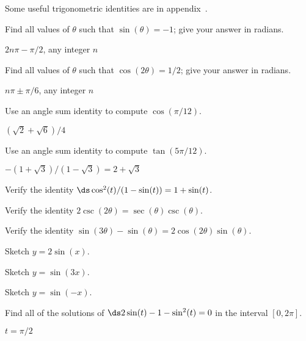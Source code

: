 \begin{exercises} Some useful trigonometric identities are in
appendix~.

\begin{exercise} Find all values of $\theta$ such that
$\sin(\theta) = -1$; give your answer in radians.
\begin{answer} $2n\pi-\pi/2$, any integer $n$
\end{answer}\end{exercise}

\begin{exercise} Find all values of $\theta$ such that
$\cos(2\theta) = 1/2$; give your answer in radians.
\begin{answer} $n\pi\pm\pi/6$, any integer $n$
\end{answer}\end{exercise}

\begin{exercise} Use an angle sum identity to compute
  $\cos(\pi/12)$.
\begin{answer} $(\sqrt2+\sqrt6)/4$
\end{answer}\end{exercise}

\begin{exercise} Use an angle sum identity to compute
  $\tan(5\pi/12)$.
\begin{answer} $-(1+\sqrt3)/(1-\sqrt3)=2+\sqrt3$
\end{answer}\end{exercise}

\begin{exercise} Verify the identity $\ds \cos^2(t)/(1-\sin(t)) =
  1+\sin(t)$.
\end{exercise}

\begin{exercise} Verify the identity $2\csc(2\theta)=\sec(\theta)\csc(\theta)$.
\end{exercise}

\begin{exercise} Verify the identity $\sin(3\theta) - \sin(\theta) = 2\cos(2\theta)
  \sin(\theta)$.
\end{exercise}

\begin{exercise} Sketch $y=2\sin(x)$.
\end{exercise}

\begin{exercise} Sketch $y=\sin(3x)$.
\end{exercise}

\begin{exercise} Sketch $y=\sin(-x)$.
\end{exercise}

\begin{exercise} Find all of the solutions of $\ds 2\sin(t) -1 -\sin^2(t) =0$ in the
 interval $[0,2\pi]$.
\begin{answer} $t=\pi/2$
\end{answer}\end{exercise}

\end{exercises}
